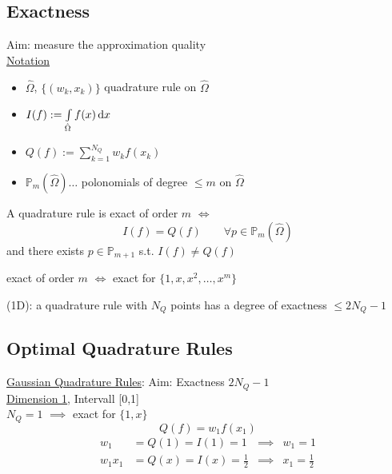 \subsection{Exactness}
Aim: measure the approximation quality\\
\underline{Notation}
\begin{itemize}
	\item $\hat{\Omega}$, $\{(w_k,x_k)\}$ quadrature rule on $\hat{\Omega}$
	\item $I(f):= \int \limits_{\hat{\Omega}} f(x) \mathop{}\!\mathrm{d} x$
	\item $Q(f):= \displaystyle \sum_{k=1}^{N_Q} w_k f(x_k)$
	\item $\mathbb{P}_m(\hat{\Omega}) \dots $ polonomials of degree $\leq m$ on $\hat{\Omega}$
\end{itemize}
\begin{definition}
	A quadrature rule is exact of order $m$ $\iff$
	\begin{equation*}
		I(f)= Q(f) \qquad \forall p\in \mathbb{P}_m(\hat{\Omega})
	\end{equation*}
	and there exists $p\in \mathbb{P}_{m+1}$ s.t. $I(f)\neq Q(f)$
\end{definition}
\begin{lemma_}
	exact of order $m$ $\iff$ exact for $\{1,x,x^2,\dots,x^m \}$
\end{lemma_}

\begin{thrm}
	(1D): a quadrature rule with $N_Q$ points has a degree of exactness $\leq 2N_Q -1$
\end{thrm}

\subsection{Optimal Quadrature Rules}
\underline{Gaussian Quadrature Rules}: Aim: Exactness $2N_Q-1$
\vspace{0.5cm}\\
\underline{Dimension 1}, Intervall [0,1]\\
$N_Q = 1$ $\implies$ exact for $\{1,x\}$
\begin{equation*}
	Q(f)= w_1f(x_1)
\end{equation*}
\begin{align*}
	w_1 &= Q(1) = I(1)= 1 &\implies & w_1 = 1\\
	w_1x_1 &= Q(x) = I(x)= \frac{1}{2} &\implies & x_1 = \frac{1}{2}
\end{align*}

